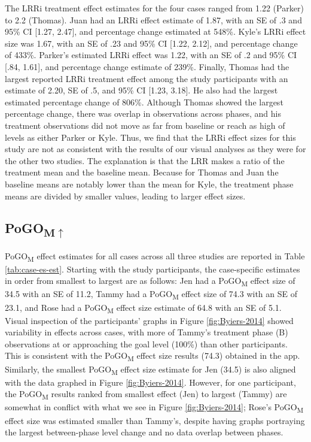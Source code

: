 \documentclass[
]{book}
\begin{document}
The LRRi treatment effect estimates for the four \citet{StrasbergerFerreri2014} cases ranged from 1.22 (Parker) to 2.2 (Thomas). Juan had an LRRi effect estimate of 1.87, with an SE of .3 and 95\% CI {[}1.27, 2.47{]}, and percentage change estimated at 548\%. Kyle's LRRi effect size was 1.67, with an SE of .23 and 95\% CI {[}1.22, 2.12{]}, and percentage change of 433\%. Parker's estimated LRRi effect was 1.22, with an SE of .2 and 95\% CI {[}.84, 1.61{]}, and percentage change estimate of 239\%. Finally, Thomas had the largest reported LRRi treatment effect among the study participants with an estimate of 2.20, SE of .5, and 95\% CI {[}1.23, 3.18{]}. He also had the largest estimated percentage change of 806\%. Although Thomas showed the largest percentage change, there was overlap in observations across phases, and his treatment observations did not move as far from baseline or reach as high of levels as either Parker or Kyle. Thus, we find that the LRRi effect sizes for this study are not as consistent with the results of our visual analyses as they were for the other two studies. The explanation is that the LRR makes a ratio of the treatment mean and the baseline mean. Because for Thomas and Juan the baseline means are notably lower than the mean for Kyle, the treatment phase means are divided by smaller values, leading to larger effect sizes.

\hypertarget{pogomuparrow}{%
\subsection{\texorpdfstring{PoGO\textsubscript{M\(\uparrow\)}}{PoGOM\textbackslash uparrow}}\label{pogomuparrow}}

PoGO\textsubscript{M} effect estimates for all cases across all three studies are reported in Table \ref{tab:case-es-est}. Starting with the \citet{Byiers2014} study participants, the case-specific estimates in order from smallest to largest are as follows: Jen had a PoGO\textsubscript{M} effect size of 34.5 with an SE of 11.2, Tammy had a PoGO\textsubscript{M} effect size of 74.3 with an SE of 23.1, and Rose had a PoGO\textsubscript{M} effect size estimate of 64.8 with an SE of 5.1. Visual inspection of the participants' graphs in Figure \ref{fig:Byiers-2014} showed variability in effects across cases, with more of Tammy's treatment phase (B) observations at or approaching the goal level (100\%) than other participants. This is consistent with the PoGO\textsubscript{M} effect size results (74.3) obtained in the app. Similarly, the smallest PoGO\textsubscript{M} effect size estimate for Jen (34.5) is also aligned with the data graphed in Figure \ref{fig:Byiers-2014}. However, for one participant, the PoGO\textsubscript{M} results ranked from smallest effect (Jen) to largest (Tammy) are somewhat in conflict with what we see in Figure \ref{fig:Byiers-2014}; Rose's PoGO\textsubscript{M} effect size was estimated smaller than Tammy's, despite having graphs portraying the largest between-phase level change and no data overlap between phases.
\end{document}
